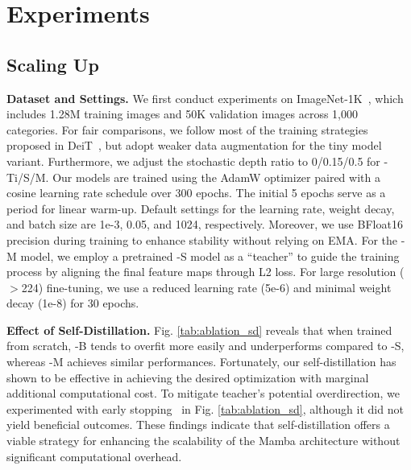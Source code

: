 \section{Experiments}
\label{sec:exp}

\subsection{Scaling Up}


\noindent\textbf{Dataset and Settings.} 
We first conduct experiments on ImageNet-1K~\cite{imagenet},
which includes 1.28M training images and 50K validation images across 1,000 categories.
For fair comparisons,
we follow most of the training strategies proposed in DeiT~\cite{deit},
but adopt weaker data augmentation for the tiny model variant.
Furthermore,
we adjust the stochastic depth ratio to 0/0.15/0.5 for \ModelName-Ti/S/M.
Our models are trained using the AdamW optimizer paired with a cosine learning rate schedule over 300 epochs. 
The initial 5 epochs serve as a period for linear warm-up. 
Default settings for the learning rate, weight decay, and batch size are 1e-3, 0.05, and 1024, respectively. 
Moreover, 
we use BFloat16 precision during training to enhance stability without relying on EMA.
For the \ModelName-M model, 
we employ a pretrained \ModelName-S model as a ``teacher'' to guide the training process by aligning the final feature maps through L2 loss.
For large resolution ($>$224) fine-tuning,
we use a reduced learning rate (5e-6) and minimal weight decay (1e-8) for 30 epochs.


\vspace{0.05cm}
\noindent\textbf{Effect of Self-Distillation.} 
Fig. \ref{tab:ablation_sd} reveals that when trained from scratch,
\ModelName-B tends to overfit more easily and underperforms compared to \ModelName-S, 
whereas \ModelName-M achieves similar performances. 
Fortunately, 
our self-distillation has shown to be effective in achieving the desired optimization with marginal additional computational cost. 
To mitigate teacher's potential overdirection, 
we experimented with early stopping~\cite{early_stopping} in Fig. \ref{tab:ablation_sd}, 
although it did not yield beneficial outcomes. 
These findings indicate that self-distillation offers a viable strategy for enhancing the scalability of the Mamba architecture without significant computational overhead.




